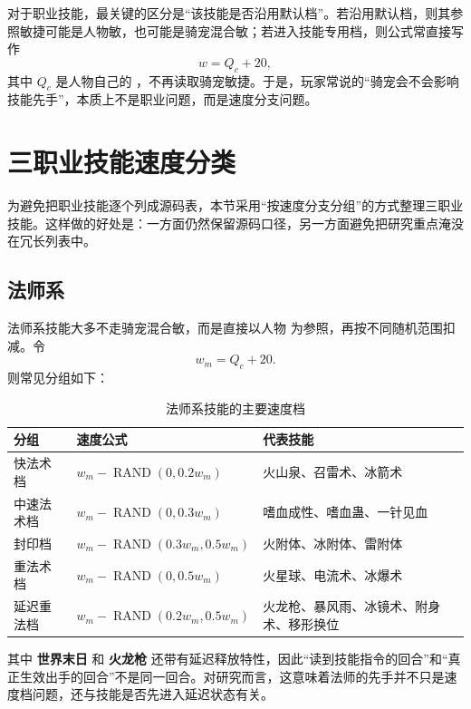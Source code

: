 对于职业技能，最关键的区分是“该技能是否沿用默认档”。若沿用默认档，则其参照敏捷可能是人物敏，也可能是骑宠混合敏；若进入技能专用档，则公式常直接写作
\begin{equation}
    w = Q_c + 20,
\end{equation}
其中 $Q_c$ 是人物自己的 ，不再读取骑宠敏捷。于是，玩家常说的“骑宠会不会影响技能先手”，本质上不是职业问题，而是速度分支问题。

\section{三职业技能速度分类}

为避免把职业技能逐个列成源码表，本节采用“按速度分支分组”的方式整理三职业技能。这样做的好处是：一方面仍然保留源码口径，另一方面避免把研究重点淹没在冗长列表中。

\subsection{法师系}

法师系技能大多不走骑宠混合敏，而是直接以人物  为参照，再按不同随机范围扣减。令
\begin{equation}
    w_m = Q_c + 20.
\end{equation}
则常见分组如下：

\begin{table}[H]
    \centering
    \caption{法师系技能的主要速度档}
    \begin{tabularx}{\textwidth}{>{\raggedright\arraybackslash}p{4.2cm} >{\raggedright\arraybackslash}p{4.4cm} X}
        \toprule
        分组 & 速度公式 & 代表技能 \\
        \midrule
        快法术档 & $w_m-\operatorname{RAND}(0,0.2w_m)$ & 火山泉、召雷术、冰箭术 \\
        中速法术档 & $w_m-\operatorname{RAND}(0,0.3w_m)$ & 嗜血成性、嗜血蛊、一针见血 \\
        封印档 & $w_m-\operatorname{RAND}(0.3w_m,0.5w_m)$ & 火附体、冰附体、雷附体 \\
        重法术档 & $w_m-\operatorname{RAND}(0,0.5w_m)$ & 火星球、电流术、冰爆术 \\
        延迟重法档 & $w_m-\operatorname{RAND}(0.2w_m,0.5w_m)$ & 火龙枪、暴风雨、冰镜术、附身术、移形换位 \\
        \bottomrule
    \end{tabularx}
\end{table}

其中 \textbf{世界末日} 和 \textbf{火龙枪} 还带有延迟释放特性，因此“读到技能指令的回合”和“真正生效出手的回合”不是同一回合。对研究而言，这意味着法师的先手并不只是速度档问题，还与技能是否先进入延迟状态有关。

